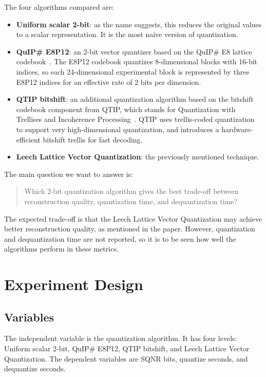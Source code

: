 \documentclass[11pt]{article}
\begin{document}
The four algorithms compared are:

\begin{itemize}
    \item \textbf{Uniform scalar 2-bit}:
        as the name suggests, this reduces the original values to a scalar representation. It is the most naive version of quantization.
    \item \textbf{QuIP\# E8P12}:
        an 2-bit vector quantizer based on the QuIP\# E8 lattice codebook~\cite{quipsharp}. The E8P12 codebook quantizes 8-dimensional
        blocks with 16-bit indices, so each 24-dimensional experimental block is represented by three E8P12 indices for an effective
        rate of 2 bits per dimension.
    \item \textbf{QTIP bitshift}: an additional quantization algorithm based on the bitshift codebook component from QTIP, which stands for Quantization with Trellises and Incoherence Processing~\cite{qtip}. QTIP uses trellis-coded quantization to support very high-dimensional quantization, and introduces a hardware-efficient bitshift trellis for fast decoding.    
    \item \textbf{Leech Lattice Vector Quantization}: the previously mentioned technique.
\end{itemize}

The main question we want to answer is:

\begin{quote}
Which 2-bit quantization algorithm gives the best trade-off between reconstruction quality, quantization time, and dequantization time?
\end{quote}

The expected trade-off is that the Leech Lattice Vector Quantization may achieve better reconstruction quality, as mentioned in the paper. However, quantization and dequantization time are not reported,
so it is to be seen how well the algorithms perform in these metrics.

\section{Experiment Design}

\subsection{Variables}

The independent variable is the quantization algorithm. It has four levels: Uniform scalar 2-bit, QuIP\# E8P12, QTIP bitshift, and Leech Lattice Vector Quantization. The dependent variables are SQNR bits, quantize seconds, and dequantize seconds.
\end{document}
